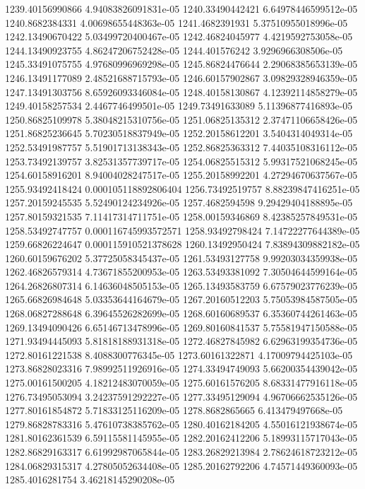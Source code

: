 {1239.40156990866 4.94083826091831e-05
1240.33490442421 6.64978446599512e-05
1240.8682384331 4.00698655448363e-05
1241.4682391931 5.37510955018996e-05
1242.13490670422 5.03499720400467e-05
1242.46824045977 4.4219592753058e-05
1244.13490923755 4.86247206752428e-05
1244.401576242 3.9296966308506e-05
1245.33491075755 4.97680996969298e-05
1245.86824476644 2.29068385653139e-05
1246.13491177089 2.48521688715793e-05
1246.60157902867 3.09829328946359e-05
1247.13491303756 8.65926093346084e-05
1248.40158130867 4.12392114858279e-05
1249.40158257534 2.4467746499501e-05
1249.73491633089 5.11396877416893e-05
1250.86825109978 5.38048215310756e-05
1251.06825135312 2.37471106658426e-05
1251.86825236645 5.70230518837949e-05
1252.20158612201 3.5404314049314e-05
1252.53491987757 5.51901713138343e-05
1252.86825363312 7.44035108316112e-05
1253.73492139757 3.82531357739717e-05
1254.06825515312 5.99317521068245e-05
1254.60158916201 8.94004028247517e-05
1255.20158992201 4.27294670637567e-05
1255.93492418424 0.000105118892806404
1256.73492519757 8.88239847416251e-05
1257.20159245535 5.52490124234926e-05
1257.4682594598 9.29429404188895e-05
1257.80159321535 7.11417314711751e-05
1258.00159346869 8.42385257849531e-05
1258.53492747757 0.000116745993572571
1258.93492798424 7.14722277644389e-05
1259.66826224647 0.000115910521378628
1260.13492950424 7.83894309882182e-05
1260.60159676202 5.37725058345437e-05
1261.53493127758 9.99203034359938e-05
1262.46826579314 4.73671855200953e-05
1263.53493381092 7.30504644599164e-05
1264.26826807314 6.14636048505153e-05
1265.13493583759 6.67579023776239e-05
1265.66826984648 5.03353644164679e-05
1267.20160512203 5.75053984587505e-05
1268.06827288648 6.39645526282699e-05
1268.60160689537 6.35360744261463e-05
1269.13494090426 6.65146713478996e-05
1269.80160841537 5.75581947150588e-05
1271.93494445093 5.81818188931318e-05
1272.46827845982 6.62963199354736e-05
1272.80161221538 8.4088300776345e-05
1273.60161322871 4.17009794425103e-05
1273.86828023316 7.98992511926916e-05
1274.33494749093 5.66200354439042e-05
1275.00161500205 4.18212483070059e-05
1275.60161576205 8.68331477916118e-05
1276.73495053094 3.24237591292227e-05
1277.33495129094 4.96706662535126e-05
1277.80161854872 5.71833125116209e-05
1278.8682865665 6.413479497668e-05
1279.86828783316 5.47610738385762e-05
1280.40162184205 4.55016121938674e-05
1281.80162361539 6.59115581145955e-05
1282.20162412206 5.18993115717043e-05
1282.86829163317 6.61992987065844e-05
1283.26829213984 2.78624618723212e-05
1284.06829315317 4.27805052634408e-05
1285.20162792206 4.74571449360093e-05
1285.4016281754 3.46218145290208e-05
}
